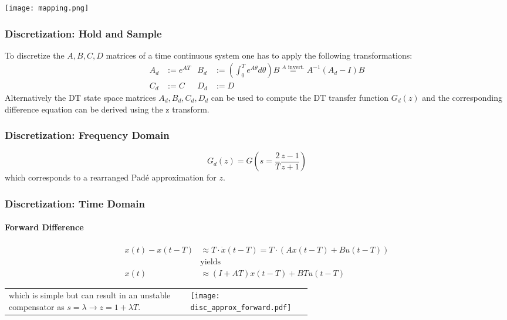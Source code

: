 \begin{center}
    \texttt{[image: mapping.png]}
\end{center}


\subsubsection{Discretization: Hold and Sample}\label{disc::hold_and_sample}

To discretize the $A, B, C, D$ matrices of a time continuous system one has to apply the following transformations:
\begin{align*}
    A_d & :=e^{AT} & B_d & :=\left(\int_0^T {e^{A\theta}}d\theta\right)B \overset{A \text{ invert.}}{=} A^{-1}\left(A_d-I\right)B \\
    C_d & :=C      & D_d & :=D
\end{align*}
Alternatively the DT state space matrices $A_d, B_d, C_d, D_d$ can be used to compute the DT transfer function $G_{d}(z)$ and the corresponding difference equation can be derived using the z transform.

\subsubsection{Discretization: Frequency Domain}\label{disc::tustin}
\begin{equation*}
    G_{d}(z)=G\left(s=\frac2T\frac{z-1}{z+1}\right)
\end{equation*}
which corresponds to a rearranged Padé approximation for $z$.

\subsubsection{Discretization: Time Domain}

\paragraph{Forward Difference}
\noindent\begin{align*}
    x(t)-x(t-T) & \approx T\cdot\dot{x}(t-T) =T\cdot(Ax(t-T)+Bu(t-T)) \\
                & \text{yields}                                       \\
    x(t)        & \approx(I+AT)x(t-T)+BTu(t-T)
\end{align*}

\begin{tabularx}{\linewidth}{@{}m{0.6\linewidth}X@{}}
    which is simple but can result in an unstable compensator as $s=\lambda \rightarrow z=1+\lambda T$.
     &
    \texttt{[image: disc\_approx\_forward.pdf]}
\end{tabularx}


